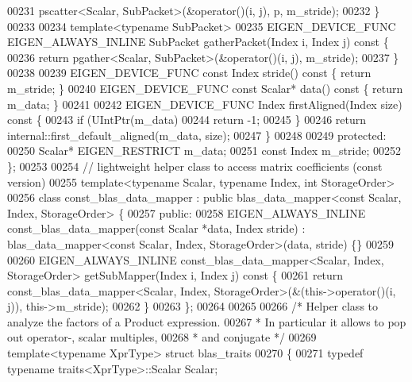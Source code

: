 \begin{DoxyCode}
00231     pscatter<Scalar, SubPacket>(&operator()(i, j), p, m\_stride);
00232   \}
00233 
00234   \textcolor{keyword}{template}<\textcolor{keyword}{typename} SubPacket>
00235   EIGEN\_DEVICE\_FUNC EIGEN\_ALWAYS\_INLINE SubPacket gatherPacket(Index i, Index j)\textcolor{keyword}{ const }\{
00236     \textcolor{keywordflow}{return} pgather<Scalar, SubPacket>(&operator()(i, j), m\_stride);
00237   \}
00238 
00239   EIGEN\_DEVICE\_FUNC \textcolor{keyword}{const} Index stride()\textcolor{keyword}{ const }\{ \textcolor{keywordflow}{return} m\_stride; \}
00240   EIGEN\_DEVICE\_FUNC \textcolor{keyword}{const} Scalar* data()\textcolor{keyword}{ const }\{ \textcolor{keywordflow}{return} m\_data; \}
00241 
00242   EIGEN\_DEVICE\_FUNC Index firstAligned(Index size)\textcolor{keyword}{ const }\{
00243     \textcolor{keywordflow}{if} (UIntPtr(m\_data)%
00244       \textcolor{keywordflow}{return} -1;
00245     \}
00246     \textcolor{keywordflow}{return} internal::first\_default\_aligned(m\_data, size);
00247   \}
00248 
00249   \textcolor{keyword}{protected}:
00250   Scalar* EIGEN\_RESTRICT m\_data;
00251   \textcolor{keyword}{const} Index m\_stride;
00252 \};
00253 
00254 \textcolor{comment}{// lightweight helper class to access matrix coefficients (const version)}
00255 \textcolor{keyword}{template}<\textcolor{keyword}{typename} Scalar, \textcolor{keyword}{typename} Index, \textcolor{keywordtype}{int} StorageOrder>
00256 \textcolor{keyword}{class }const\_blas\_data\_mapper : \textcolor{keyword}{public} blas\_data\_mapper<const Scalar, Index, StorageOrder> \{
00257   \textcolor{keyword}{public}:
00258   EIGEN\_ALWAYS\_INLINE const\_blas\_data\_mapper(\textcolor{keyword}{const} Scalar *data, Index stride) : blas\_data\_mapper<const 
      Scalar, Index, StorageOrder>(data, stride) \{\}
00259 
00260   EIGEN\_ALWAYS\_INLINE const\_blas\_data\_mapper<Scalar, Index, StorageOrder> getSubMapper(Index i, Index j)\textcolor{keyword}{
       const }\{
00261     \textcolor{keywordflow}{return} const\_blas\_data\_mapper<Scalar, Index, StorageOrder>(&(this->operator()(i, j)), this->m\_stride);
00262   \}
00263 \};
00264 
00265 
00266 \textcolor{comment}{/* Helper class to analyze the factors of a Product expression.}
00267 \textcolor{comment}{ * In particular it allows to pop out operator-, scalar multiples,}
00268 \textcolor{comment}{ * and conjugate */}
00269 \textcolor{keyword}{template}<\textcolor{keyword}{typename} XprType> \textcolor{keyword}{struct }blas\_traits
00270 \{
00271   \textcolor{keyword}{typedef} \textcolor{keyword}{typename} traits<XprType>::Scalar Scalar;

\end{DoxyCode}
